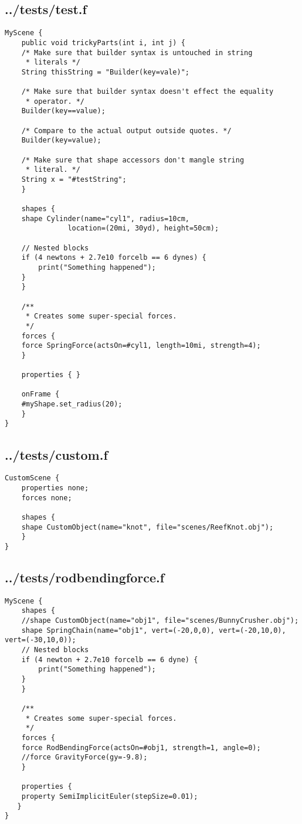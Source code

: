 \subsection*{../tests/test.f}
\begin{lstlisting}
MyScene {
    public void trickyParts(int i, int j) {
	/* Make sure that builder syntax is untouched in string
	 * literals */
	String thisString = "Builder(key=vale)";

	/* Make sure that builder syntax doesn't effect the equality
	 * operator. */
	Builder(key==value);

	/* Compare to the actual output outside quotes. */
	Builder(key=value);

	/* Make sure that shape accessors don't mangle string
	 * literal. */
	String x = "#testString";
    }
	
    shapes {
	shape Cylinder(name="cyl1", radius=10cm, 
		       location=(20mi, 30yd), height=50cm);

	// Nested blocks
	if (4 newtons + 2.7e10 forcelb == 6 dynes) {
	    print("Something happened");
	}
    }

    /**
     * Creates some super-special forces.
     */
    forces {
	force SpringForce(actsOn=#cyl1, length=10mi, strength=4);
    }

    properties { }

    onFrame {
	#myShape.set_radius(20);
    }
}
\end{lstlisting}

\subsection*{../tests/custom.f}
\begin{lstlisting}
CustomScene {
    properties none;
    forces none;

    shapes {
	shape CustomObject(name="knot", file="scenes/ReefKnot.obj");
    }
}
\end{lstlisting}

\subsection*{../tests/rodbendingforce.f}
\begin{lstlisting}
MyScene {
    shapes {
	//shape CustomObject(name="obj1", file="scenes/BunnyCrusher.obj");
	shape SpringChain(name="obj1", vert=(-20,0,0), vert=(-20,10,0), vert=(-30,10,0));
	// Nested blocks
	if (4 newton + 2.7e10 forcelb == 6 dyne) {
	    print("Something happened");
	}
    }

    /**
     * Creates some super-special forces.
     */
    forces {
	force RodBendingForce(actsOn=#obj1, strength=1, angle=0);
	//force GravityForce(gy=-9.8);
    }

    properties { 
	property SemiImplicitEuler(stepSize=0.01);
   }
}
\end{lstlisting}

